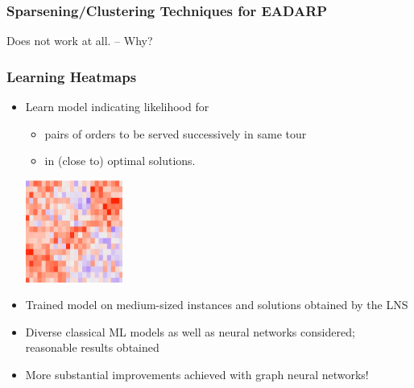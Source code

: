 \documentclass[aspectratio=1610]{beamer}
\newcommand{\important}[1]{{\color{green!60!black}#1}}
\begin{document}
\begin{frame}
	\frametitle{Sparsening/Clustering Techniques for EADARP}


	\bigskip
	\alert{Does not work at all.} -- Why? 

	\bigskip
\end{frame}

\begin{frame}
	\frametitle{Learning Heatmaps}

	\begin{itemize}
		\itemsep2ex
		\item Learn model indicating likelihood for
		\begin{itemize}
			\item pairs of orders to be served successively in same tour
			\item in (close to) optimal solutions.
		\end{itemize}
		\includegraphics[width=0.25\textwidth]{graphics/heatmap.jpg}
		\item Trained model on medium-sized instances and solutions obtained by the LNS
		\item Diverse classical ML models as well as neural networks considered;\\ \important{reasonable results obtained}
		\item<3> \important{More substantial improvements achieved with graph neural networks!}
	\end{itemize}

\end{frame}
\end{document}
